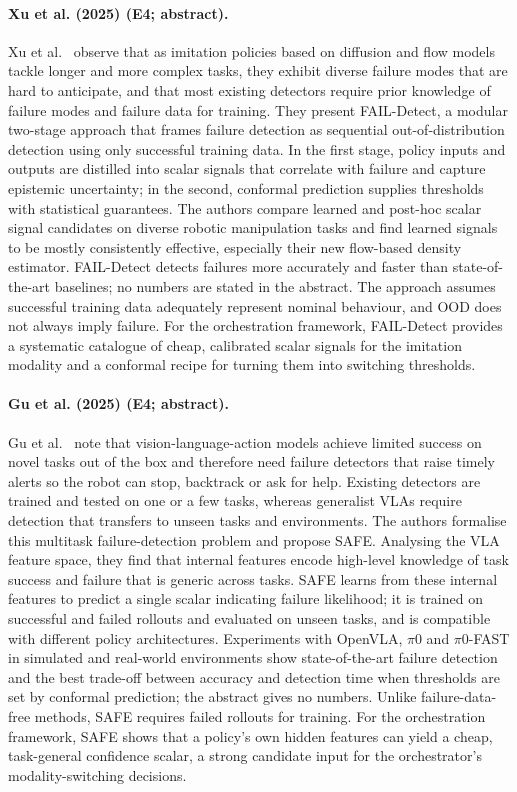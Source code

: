 \documentclass[10pt,a4paper]{article}
\begin{document}
\paragraph{Xu et al. (2025) (E4; abstract).} Xu et al.~\cite{Xu2025} observe that as imitation policies based on diffusion and flow models tackle longer and more complex tasks, they exhibit diverse failure modes that are hard to anticipate, and that most existing detectors require prior knowledge of failure modes and failure data for training. They present FAIL-Detect, a modular two-stage approach that frames failure detection as sequential out-of-distribution detection using only successful training data. In the first stage, policy inputs and outputs are distilled into scalar signals that correlate with failure and capture epistemic uncertainty; in the second, conformal prediction supplies thresholds with statistical guarantees. The authors compare learned and post-hoc scalar signal candidates on diverse robotic manipulation tasks and find learned signals to be mostly consistently effective, especially their new flow-based density estimator. FAIL-Detect detects failures more accurately and faster than state-of-the-art baselines; no numbers are stated in the abstract. The approach assumes successful training data adequately represent nominal behaviour, and OOD does not always imply failure. For the orchestration framework, FAIL-Detect provides a systematic catalogue of cheap, calibrated scalar signals for the imitation modality and a conformal recipe for turning them into switching thresholds.

\paragraph{Gu et al. (2025) (E4; abstract).} Gu et al.~\cite{Gu2025} note that vision-language-action models achieve limited success on novel tasks out of the box and therefore need failure detectors that raise timely alerts so the robot can stop, backtrack or ask for help. Existing detectors are trained and tested on one or a few tasks, whereas generalist VLAs require detection that transfers to unseen tasks and environments. The authors formalise this multitask failure-detection problem and propose SAFE. Analysing the VLA feature space, they find that internal features encode high-level knowledge of task success and failure that is generic across tasks. SAFE learns from these internal features to predict a single scalar indicating failure likelihood; it is trained on successful and failed rollouts and evaluated on unseen tasks, and is compatible with different policy architectures. Experiments with OpenVLA, $\pi$0 and $\pi$0-FAST in simulated and real-world environments show state-of-the-art failure detection and the best trade-off between accuracy and detection time when thresholds are set by conformal prediction; the abstract gives no numbers. Unlike failure-data-free methods, SAFE requires failed rollouts for training. For the orchestration framework, SAFE shows that a policy's own hidden features can yield a cheap, task-general confidence scalar, a strong candidate input for the orchestrator's modality-switching decisions.
\end{document}
